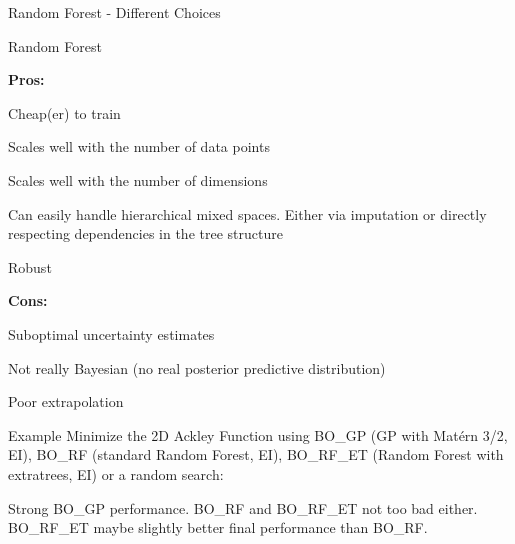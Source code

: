 \documentclass[11pt,compress,t,notes=noshow, xcolor=table]{beamer}
\begin{document}
\begin{framev}{Random Forest - Different Choices}
\end{framev}


\begin{framei}{Random Forest}
\item[] \textbf{Pros:}
\item Cheap(er) to train
\item Scales well with the number of data points
\item Scales well with the number of dimensions
\item Can easily handle hierarchical mixed spaces. Either via imputation or directly respecting dependencies in the tree structure
\item Robust
\spacer
\item[] \textbf{Cons:}
\item Suboptimal uncertainty estimates
\item Not really Bayesian (no real posterior predictive distribution)
\item Poor extrapolation
\end{framei}


\begin{framev}[fs=small]{Example}
Minimize the 2D Ackley Function using BO\_GP (GP with Matérn 3/2, EI), BO\_RF (standard Random Forest, EI), BO\_RF\_ET (Random Forest with extratrees, EI) or a random search:
\begin{footnotesize}
Strong BO\_GP performance. BO\_RF and BO\_RF\_ET not too bad either. BO\_RF\_ET maybe slightly better final performance than BO\_RF.
\end{footnotesize}
\end{framev}

\endlecture
\end{document}
